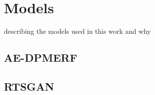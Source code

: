 \section{Models}\label{chapter4}
describing the models used in this work and why

\subsection{AE-DPMERF}

\subsection{RTSGAN}